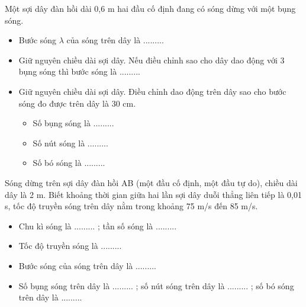 \begin{vidu}%
Một sợi dây đàn hồi dài 0,6 m hai đầu cố định đang có sóng dừng với một bụng sóng.
\begin{itemize}
\item[1.] Bước sóng $\lambda$ của sóng trên dây là .........
\item[2.] Giữ nguyên chiều dài sợi dây. Nếu điều chỉnh sao cho dây dao động với 3 bụng sóng thì bước sóng là .........
\item[3.] Giữ nguyên chiều dài sợi dây. Điều chỉnh dao động trên dây sao cho bước sóng đo được trên dây là 30 cm. 
\begin{itemize}
\item Số bụng sóng là ......... 
\item Số nút sóng là ......... 
\item Số bó sóng  là ......... 
\end{itemize}
\end{itemize}
\end{vidu}
\begin{vidu}%
Sóng dừng trên sợi dây đàn hồi AB (một đầu cố định, một đầu tự do), chiều dài dây là 2 m. Biết khoảng thời gian giữa hai lần sợi dây duỗi thẳng liên tiếp là 0,01 s, tốc độ truyền sóng trên dây nằm trong khoảng 75 m/s đến 85 m/s. 
\begin{itemize}
\item[1.] Chu kì sóng  là ......... ; tần số sóng là ......... 
\item[2.] Tốc độ truyền sóng là ......... 
\item[3.] Bước sóng của sóng trên dây là ......... 
\item[4.] Số bụng sóng  trên dây  là ......... ; số nút sóng trên dây  là ......... ; số bó sóng trên dây là ......... 
\end{itemize}
\end{vidu} %
